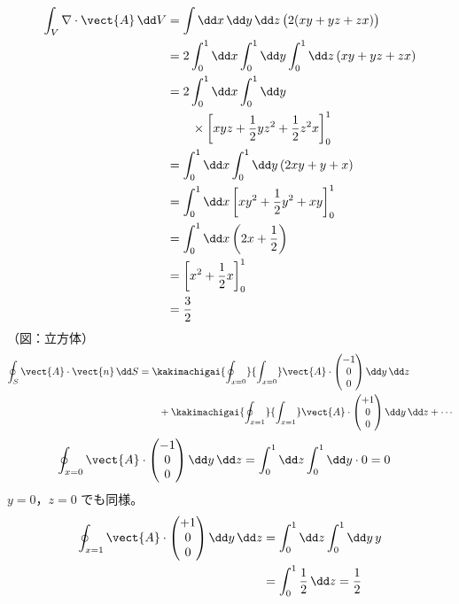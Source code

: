 \begin{align*}
\int_{V}\nabla\cdot\vect{A}\,\dd V&=\int\dd x\,\dd y\,\dd z\,\bigl(2(xy+yz+zx)\bigr)\\
&=2\int_{0}^{1}\dd x\int_{0}^{1}\dd y\int_{0}^{1}\dd z\,(xy+yz+zx)\\
&=2\int_{0}^{1}\dd x\int_{0}^{1}\dd y\\
&\qquad\times\left[xyz+\frac{1}{2}yz^{2}+\frac{1}{2}z^{2}x\right]_{0}^{1}\\
&=\int_{0}^{1}\dd x\int_{0}^{1}\dd y\,(2xy+y+x)\\
&=\int_{0}^{1}\dd x\left[xy^{2}+\frac{1}{2}y^{2}+xy\right]_{0}^{1}\\
&=\int_{0}^{1}\dd x\left(2x+\frac{1}{2}\right)\\
&=\left[x^{2}+\frac{1}{2}x\right]_{0}^{1}\\
&=\frac{3}{2}
\end{align*}
（図：立方体）
\begin{align*}
\oint_{S}\vect{A}\cdot\vect{n}\,\dd S&=\kakimachigai{\oint_{x=0}}{\int_{x=0}}\vect{A}\cdot\begin{pmatrix}-1\\0\\0\end{pmatrix}\dd y\,\dd z\\
&\qquad+\kakimachigai{\oint_{x=1}}{\int_{x=1}}\vect{A}\cdot\begin{pmatrix}+1\\0\\0\end{pmatrix}\dd y\,\dd z+\cdots
\end{align*}
\begin{align*}
\oint_{x=0}\vect{A}\cdot\begin{pmatrix}-1\\0\\0\end{pmatrix}\dd y\,\dd z&=\int_{0}^{1}\dd z\int_{0}^{1}\dd y\cdot 0=0
\end{align*}
$y=0$，$z=0$ でも同様。
\begin{align*}
\oint_{x=1}\vect{A}\cdot\begin{pmatrix}+1\\0\\0\end{pmatrix}\dd y\,\dd z&=\int_{0}^{1}\dd z\int_{0}^{1}\dd y\,y\\
&=\int_{0}^{1}\frac{1}{2}\,\dd z=\frac{1}{2}
\end{align*}
